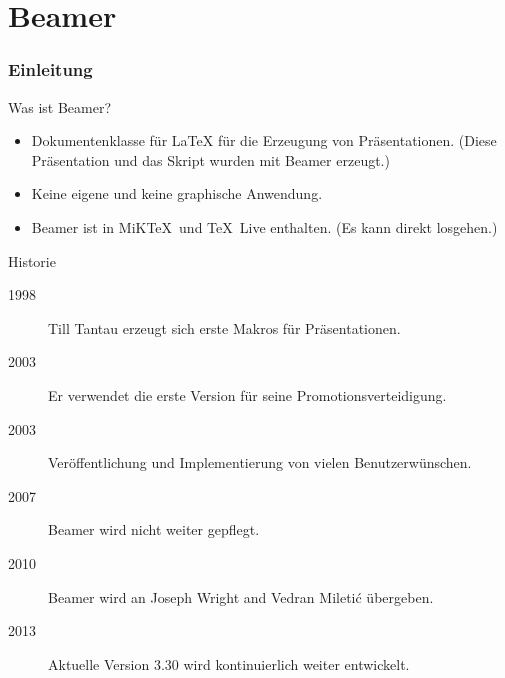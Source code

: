 \chapter{Beamer}


\website


\subsection{Einleitung}

\begin{Frame}{Was ist Beamer?}
  \begin{itemize}
    \item \alert{Dokumentenklasse für \LaTeX} für die Erzeugung von Präsentationen.\newline
      (Diese Präsentation und das Skript wurden mit Beamer erzeugt.)
    \item Keine eigene und \alert{keine graphische Anwendung}.
    \item Beamer ist in MiK\TeX\ und \TeX\ Live enthalten.\newline
      (\alert{Es kann direkt losgehen}.)
  \end{itemize}
\end{Frame}

\begin{Frame}{Historie}
  \begin{description}
    \item[1998] Till Tantau erzeugt sich erste Makros für Präsentationen.
    \item[2003] Er verwendet die erste Version für seine Promotionsverteidigung.
    \item[2003] Veröffentlichung und Implementierung von vielen Benutzerwünschen.
    \item[2007] Beamer wird nicht weiter gepflegt.
    \item[2010] Beamer wird an Joseph Wright and Vedran Mileti\'c übergeben.
    \item[2013] Aktuelle Version 3.30 wird kontinuierlich weiter entwickelt.
  \end{description}
\end{Frame}

